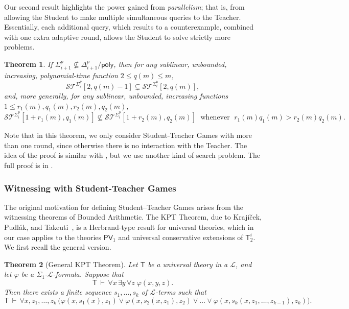 \documentclass[11pt]{article}
\newcommand{\poly}{\mathsf{poly}}
\newcommand{\PV}{\mathsf{PV}}
\newtheorem{theorem}{Theorem}[section]
\theoremstyle{definition}
\theoremstyle{definition}
\theoremstyle{remark}
\begin{document}
Our second result highlights the power gained from \emph{parallelism}; that is, from allowing the Student to make multiple simultaneous queries to the Teacher. 
Essentially, each additional query, which results to a counterexample, combined with one extra adaptive round, allows the Student to solve strictly more problems.

\begin{theorem}\label{thm:st2}
If $\Sigma^p_{i+1}\not\subseteq\Delta^p_{i+1}/\poly$, then for any sublinear, unbounded, increasing, polynomial-time function $2\leq q(m)\leq m$,
\[
\mathcal{ST}^{\Sigma^p_i}[2,q(m)-1] \subsetneq \mathcal{ST}^{\Sigma^b_i}[2,q(m)],
\]
and, more generally, for any sublinear, unbounded, increasing functions $1\leq r_1(m), q_1(m), r_2(m), q_2(m)$,
\[
\mathcal{ST}^{\Sigma^p_i}[1+r_1(m),q_1(m)] \not\subseteq \mathcal{ST}^{\Sigma^p_i}[1+r_2(m),q_2(m)]
\;\text{   whenever   }\; r_1(m)q_1(m) > r_2(m)q_2(m).
\]
\end{theorem}

Note that in this theorem, we only consider Student-Teacher Games with more than one round, since otherwise there is no interaction with the Teacher. The idea of the proof is similar with , but we use another kind of search problem. The full proof is in .


\subsubsection{Witnessing with Student-Teacher Games}
The original motivation for defining Student--Teacher Games arises from the witnessing theorems of Bounded Arithmetic. 
The KPT Theorem, due to Krajíček, Pudlák, and Takeuti~\cite{KrajicekPT91}, is a Herbrand-type result for universal theories, which in our case applies to the theories $\PV_1$ and universal conservative extensions of $\mathsf{T}^i_2$. 
We first recall the general version.

\begin{theorem}[General KPT Theorem]
Let $\mathsf{T}$ be a universal theory in a $\mathcal{L}$, and let $\varphi$ be a $\Sigma_1$-$\mathcal{L}$-formula. 
Suppose that
\[
\mathsf{T} \,\vdash\, \forall x\, \exists y \, \forall z \;\varphi(x,y,z).
\]
Then there exists a finite sequence $s_1, \dots, s_k$ of $\mathcal{L}$-terms such that
\[
\mathsf{T} \,\vdash\,  \forall x,z_1,\dots,z_k\,
\bigl(\varphi(x,s_1(x),z_1) \lor \varphi(x,s_2(x,z_1),z_2) \lor \dots \lor \varphi(x,s_k(x,z_1,\dots,z_{k-1}),z_k)\bigr).
\]
\end{theorem}
\end{document}
